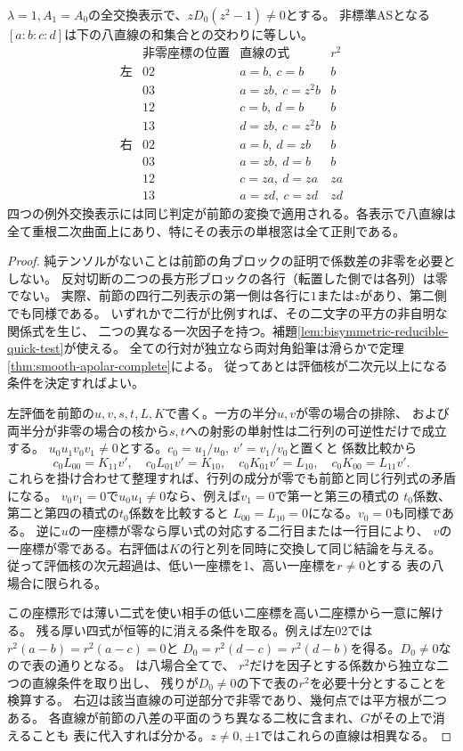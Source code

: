 \begin{theorem}\label{thm:exceptional-exchange-eight-lines}
$\lambda=1,A_1=A_0$の全交換表示で、$zD_0(z^2-1)\ne0$とする。
非標準ASとなる$[a:b:c:d]$は下の八直線の和集合との交わりに等しい。
\[
\begin{array}{c|c|c|c}
 &\text{非零座標の位置}&\text{直線の式}& r^2\\\hline
\text{左}&02&a=b,\ c=b&b\\
 &03&a=zb,\ c=z^2b&b\\
 &12&c=b,\ d=b&b\\
 &13&d=zb,\ c=z^2b&b\\\hline
\text{右}&02&a=b,\ d=zb&b\\
 &03&a=zb,\ d=b&b\\
 &12&c=za,\ d=za&za\\
 &13&a=zd,\ c=zd&zd
\end{array}
\]
四つの例外交換表示には同じ判定が前節の変換で適用される。各表示で八直線は
全て重根二次曲面上にあり、特にその表示の単根窓は全て正則である。
\end{theorem}
\begin{proof}
純テンソルがないことは前節の角ブロックの証明で係数差の非零を必要としない。
反対切断の二つの長方形ブロックの各行（転置した側では各列）は零でない。
実際、前節の四行二列表示の第一側は各行に$1$または$z$があり、第二側でも同様である。
いずれかで二行が比例すれば、その二文字の平方の非自明な関係式を生じ、
二つの異なる一次因子を持つ。補題\ref{lem:bisymmetric-reducible-quick-test}が使える。
全ての行対が独立なら両対角鉛筆は滑らかで定理\ref{thm:smooth-apolar-complete}による。
従ってあとは評価核が二次元以上になる条件を決定すればよい。

左評価を前節の$u,v,s,t,L,K$で書く。一方の半分$u,v$が零の場合の排除、
および両半分が非零の場合の核から$s,t$への射影の単射性は二行列の可逆性だけで成立する。
$u_0u_1v_0v_1\ne0$とする。$c_0=u_1/u_0$, $v'=v_1/v_0$と置くと
係数比較から
\[
 c_0 L_{00}=K_{11}v',\quad c_0L_{01}v'=K_{10},\quad
 c_0K_{01}v'=L_{10},\quad c_0K_{00}=L_{11}v' .
\]
これらを掛け合わせて整理すれば、行列の成分が零でも前節と同じ行列式の矛盾になる。
$v_0v_1=0$で$u_0u_1\ne0$なら、例えば$v_1=0$で第一と第三の積式の
$t_0$係数、第二と第四の積式の$t_0$係数を比較すると
$L_{00}=L_{10}=0$になる。$v_0=0$も同様である。
逆に$u$の一座標が零なら厚い式の対応する二行目または一行目により、
$v$の一座標が零である。右評価は$K$の行と列を同時に交換して同じ結論を与える。
従って評価核の次元超過は、低い一座標を1、高い一座標を$r\ne0$とする
表の八場合に限られる。

この座標形では薄い二式を使い相手の低い二座標を高い二座標から一意に解ける。
残る厚い四式が恒等的に消える条件を取る。例えば左02では
$r^2(a-b)=r^2(a-c)=0$と
$D_0=r^2(d-c)=r^2(d-b)$を得る。$D_0\ne0$なので表の通りとなる。
は八場合全てで、
$r^2$だけを因子とする係数から独立な二つの直線条件を取り出し、
残りが$D_0\ne0$の下で表の$r^2$を必要十分とすることを検算する。
右辺は該当直線の可逆部分で非零であり、幾何点では平方根が二つある。
各直線が前節の八差の平面のうち異なる二枚に含まれ、$G$がその上で消えることも
表に代入すれば分かる。$z\ne0,\pm1$ではこれらの直線は相異なる。
\end{proof}
